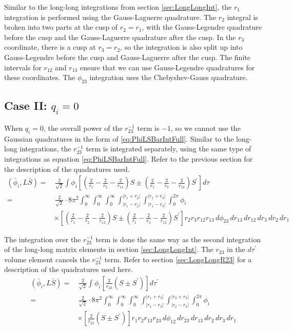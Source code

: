 \documentclass[Dissertation.tex]{subfiles}
\begin{document}
Similar to the long-long integrations from section \ref{sec:LongLongInt}, the $r_1$ integration is performed using the Gauss-Laguerre quadrature.  The $r_2$ integral is broken into two parts at the cusp of $r_2 = r_1$, with the Gauss-Legendre quadrature before the cusp and the Gauss-Laguerre quadrature after the cusp.  In the $r_3$ coordinate, there is a cusp at $r_3 = r_2$, so the integration is also split up into Gauss-Legendre before the cusp and Gauss-Laguerre after the cusp.  The finite intervals for $r_{12}$ and $r_{13}$ ensure that we can use Gauss-Legendre quadratures for these coordinates.  The $\phi_{23}$ integration uses the Chebyshev-Gauss quadrature.

\subsection{Case II: \texorpdfstring{$q_i = 0$}{qi = 0}}
When $q_i = 0$, the overall power of the $r_{23}^{-1}$ term is $-1$, so we cannot use the Gaussian quadratures in the form of \ref{eq:PhiLSBarIntFull}.  Similar to the long-long integrations, the $r_{23}^{-1}$ term is integrated separately, using the same type of integrations as equation \ref{eq:PhiLSBarIntFull}.  Refer to the previous section for the description of the quadratures used.
\begin{align}
\label{eq:PhiLSBarIntNoR23}
\nonumber (\bar{\phi}_i, L\bar{S}) =& \,\frac{2}{\sqrt{2}} \int \phi_i \left[ \left( \frac{2}{r_1} - \frac{2}{r_2} - \frac{2}{r_{13}} \right)S \pm \left( \frac{2}{r_1} - \frac{2}{r_3} - \frac{2}{r_{12}} \right) S^\prime \right]  d\tau \\
=&\, \frac{2}{\sqrt{2}} \cdot 8\pi^2  \int_0^\infty \int_0^\infty \int_0^\infty \int_{|r_1 - r_2|}^{|r_1 + r_2|} \int_{|r_1 - r_3|}^{|r_1 + r_3|} \int_0^{2\pi} \phi_i \\
&\times \left[ \left( \frac{2}{r_1} - \frac{2}{r_2} - \frac{2}{r_{13}} \right)S \pm \left( \frac{2}{r_1} - \frac{2}{r_3} - \frac{2}{r_{12}} \right) S^\prime \right]  r_2 r_3 r_{12} r_{13}\, d\phi_{23}\, dr_{13}\, dr_{12}\, dr_3\, dr_2\, dr_1
\end{align}

The integration over the $r_{23}^{-1}$ term is done the same way as the second integration of the long-long matrix elements in section \ref{sec:LongLongInt}.  The $r_{23}$ in the $d\tau^\prime$ volume element cancels the $r_{23}^{-1}$ term.  Refer to section \ref{sec:LongLongR23} for a description of the quadratures used here.
\begin{align}
\label{eq:PhiLSBarIntR23}
\nonumber (\bar{\phi}_i, L\bar{S}) =& \,\frac{2}{\sqrt{2}} \int \phi_i \left[ \frac{2}{r_{23}}\left(S \pm S^\prime\right) \right] d\tau^\prime \\
=&\, \frac{2}{\sqrt{2}} \cdot 8\pi^2  \int_0^\infty \int_0^\infty \int_0^\infty \int_{|r_1 - r_3|}^{|r_1 + r_3|} \int_{|r_2 - r_3|}^{|r_2 + r_3|} \int_0^{2\pi} \phi_i \\
&\times \left[ \frac{2}{r_{23}}\left(S \pm S^\prime\right) \right]  r_1 r_2 r_{13} r_{23}\, d\phi_{12}\, dr_{23}\, dr_{13}\, dr_2\, dr_3\, dr_1
\end{align}
\end{document}
